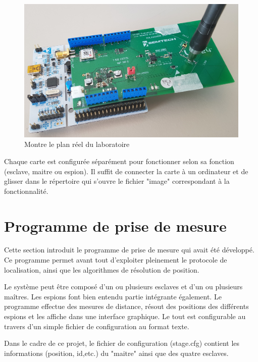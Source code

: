 \begin{figure}[htp]
 \begin{center}
  \includegraphics[scale=0.1]{figures/carte.jpg}
  \caption{Montre le plan réel du laboratoire}
  \label{fig:carte} %
 \end{center}
\end{figure}

Chaque carte est configurée séparément pour fonctionner selon sa fonction (esclave, maitre ou espion). Il suffit de connecter la carte à un ordinateur et de glisser dans le répertoire qui s'ouvre le fichier "image" correspondant à la fonctionnalité. 

\section{Programme de prise de mesure \cite{MIC}}

Cette section introduit le programme de prise de mesure qui avait été développé. Ce programme permet avant tout d’exploiter pleinement le protocole de localisation, ainsi que les algorithmes de résolution de position. 

Le système peut être composé d’un ou plusieurs esclaves et d’un ou plusieurs maîtres. Les espions font bien entendu partie intégrante également. Le programme effectue des mesures de distance, résout des positions des différents espions et les affiche dans une interface graphique. Le tout est configurable au travers d’un simple fichier de configuration au format texte.

Dans le cadre de ce projet, le fichier de configuration (stage.cfg) contient les informations (position, id,etc.) du "maitre" ainsi que des quatre esclaves. 

